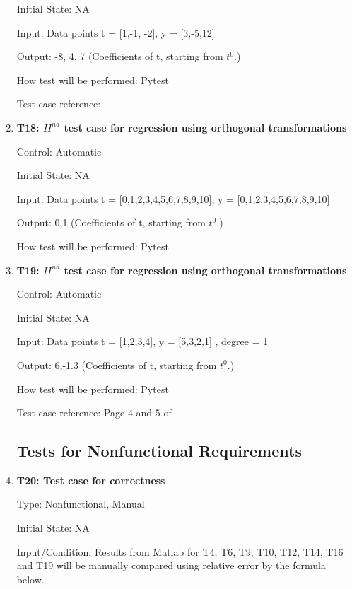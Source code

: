 \documentclass[12pt, titlepage]{article}
\begin{document}
\begin{enumerate}
Initial State: NA

Input: Data points t = [1,-1, -2], y = [3,-5,12] 

Output: -8, 4, 7 (Coefficients of t, starting from $t^{0}$.)

How test will be performed: Pytest

Test case reference: \cite{RegAugmented}\\


\item{\textbf{T18: ${II}^{nd}$ test case for regression using orthogonal transformations}\\}

Control: Automatic

Initial State: NA

Input: Data points t = [0,1,2,3,4,5,6,7,8,9,10], y = [0,1,2,3,4,5,6,7,8,9,10] 

Output: 0,1 (Coefficients of t, starting from $t^{0}$.)

How test will be performed: Pytest\\


\item{\textbf{T19: ${II}^{nd}$ test case for regression using orthogonal transformations}\\}

Control: Automatic

Initial State: NA

Input: Data points t = [1,2,3,4], y = [5,3,2,1] , degree = 1

Output: 6,-1.3 (Coefficients of t, starting from $t^{0}$.)

How test will be performed: Pytest

Test case reference: Page $4$ and $5$ of \cite{RegOrthogonal}\\



\subsection{Tests for Nonfunctional Requirements}



\item{\textbf{T20: Test case for correctness}\\}

Type: Nonfunctional, Manual
					
Initial State: NA
					
Input/Condition: Results from Matlab for T4, T6, T9, T10, T12, T14, T16 and T19 will be manually compared using relative error by the formula below.


\end{enumerate}
\end{document}
